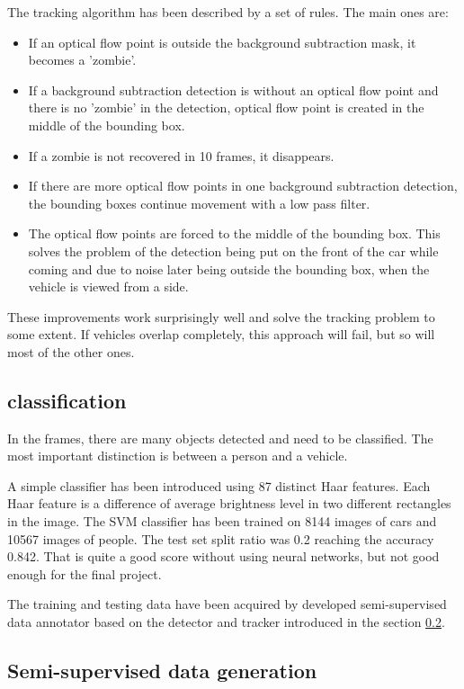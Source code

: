 \documentclass[a4paper,12pt,titlepage]{article}
\numberwithin{figure}{section}
\begin{document}
The tracking algorithm has been described by a set of rules. The main ones are:
\begin{itemize}
	\item If an optical flow point is outside the background subtraction mask, it becomes a 'zombie'.
	\item If a background subtraction detection is without an optical flow point and there is no 'zombie' in the detection, optical flow point is created in the middle of the bounding box. 
	\item If a zombie is not recovered in 10 frames, it disappears. 
	\item If there are more optical flow points in one background subtraction detection, the bounding boxes continue movement with a low pass filter.
	\item The optical flow points are forced to the middle of the bounding box. This solves the problem of the detection being put on the front of the car while coming and due to noise later being outside the bounding box, when the vehicle is viewed from a side. 
\end{itemize}

These improvements work surprisingly well and solve the tracking problem to some extent. If vehicles overlap completely, this approach will fail, but so will most of the other ones. 

\subsection{classification}

In the frames, there are many objects detected and need to be classified. The most important distinction is between a person and a vehicle. 

A simple classifier has been introduced using 87 distinct Haar features.  Each Haar feature is a difference of average brightness level in two different rectangles in the image. The SVM classifier has been trained on 8144 images of cars and 10567 images of people. The test set split ratio was 0.2 reaching the accuracy 0.842. That is quite a good score without using neural networks, but not good enough for the final project.

The training and testing data have been acquired by developed semi-supervised data annotator based on the detector and tracker introduced in the section \ref{sec:data-generation}.

\subsection{Semi-supervised data generation} 
\label{sec:data-generation}
\end{document}

